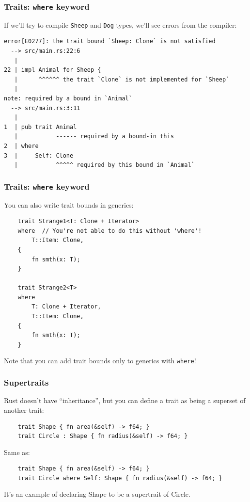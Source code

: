 \documentclass[aspectratio=1610,t]{beamer}
\begin{document}

\begin{frame}[fragile]
\frametitle{Traits: \texttt{where} keyword}
If we'll try to compile \texttt{Sheep} and \texttt{Dog} types, we'll see errors from the compiler:

\begin{verbatim}
error[E0277]: the trait bound `Sheep: Clone` is not satisfied
  --> src/main.rs:22:6
   |
22 | impl Animal for Sheep {
   |      ^^^^^^ the trait `Clone` is not implemented for `Sheep`
   |
note: required by a bound in `Animal`
  --> src/main.rs:3:11
   |
1  | pub trait Animal
   |           ------ required by a bound-in this
2  | where
3  |     Self: Clone
   |           ^^^^^ required by this bound in `Animal`
\end{verbatim}
\end{frame}


\begin{frame}[fragile]
\frametitle{Traits: \texttt{where} keyword}
You can also write trait bounds in generics:

\begin{verbatim}
    trait Strange1<T: Clone + Iterator> 
    where  // You're not able to do this without 'where'!
        T::Item: Clone,
    {
        fn smth(x: T);
    }

    trait Strange2<T> 
    where
        T: Clone + Iterator,
        T::Item: Clone,
    {
        fn smth(x: T);
    }
\end{verbatim}

Note that you can add trait bounds only to generics with \texttt{where}!
\end{frame}


\begin{frame}[fragile]
\frametitle{Supertraits}
Rust doesn't have ``inheritance'', but you can define a trait as being a superset of another trait:

\begin{verbatim}
    trait Shape { fn area(&self) -> f64; }
    trait Circle : Shape { fn radius(&self) -> f64; }
\end{verbatim}

Same as: 

\begin{verbatim}
    trait Shape { fn area(&self) -> f64; }
    trait Circle where Self: Shape { fn radius(&self) -> f64; }
\end{verbatim}



It's an example of declaring Shape to be a supertrait of Circle.
\end{frame}
\end{document}
